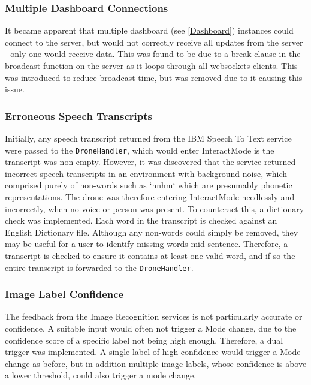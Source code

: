 \documentclass{article}
\begin{document}
\subsubsection{Multiple Dashboard Connections}
It became apparent that multiple dashboard (see \ref{Dashboard}) instances could connect to the server, but would not correctly receive all updates from the server - only one would receive data. This was found to be due to a break clause in the broadcast function on the server as it loops through all websockets clients. This was introduced to reduce broadcast time, but was removed due to it causing this issue.

\subsubsection{Erroneous Speech Transcripts}
Initially, any speech transcript returned from the IBM Speech To Text service were passed to the \texttt{DroneHandler}, which would enter InteractMode is the transcript was non empty. However, it was discovered that the service returned incorrect speech transcripts in an environment with background noise, which comprised purely of non-words such as `nnhm` which are presumably phonetic representations. The drone was therefore entering InteractMode needlessly and incorrectly, when no voice or person was present. To counteract this, a dictionary check was implemented. Each word in the transcript is checked against an English Dictionary file. Although any non-words could simply be removed, they may be useful for a user to identify missing words mid sentence. Therefore, a transcript is checked to ensure it contains at least one valid word, and if so the entire transcript is forwarded to the \texttt{DroneHandler}. 

\subsubsection{Image Label Confidence}
The feedback from the Image Recognition services is not particularly accurate or confidence. A suitable input would often not trigger a Mode change, due to the confidence score of a specific label not being high enough. Therefore, a dual trigger was implemented. A single label of high-confidence would trigger a Mode change as before, but in addition multiple image labels, whose confidence is above a lower threshold, could also trigger a mode change.
\end{document}
